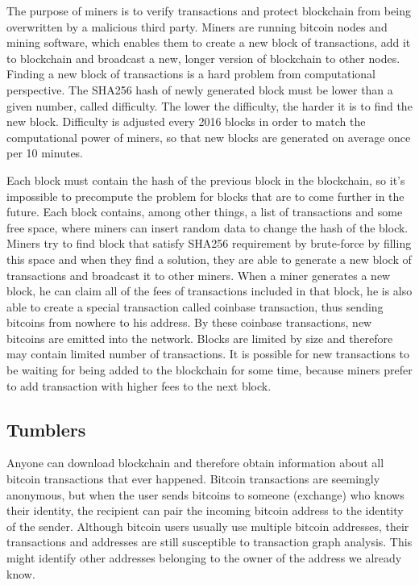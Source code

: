 \documentclass[
  digital, %
  table,   %
  lof,     %
  lot,     %
  oneside
]{fithesis3}
\begin{document}
The purpose of miners is to verify transactions and protect blockchain
from being overwritten by a malicious third party.
Miners are running bitcoin nodes and mining software,
which enables them to create a new block of transactions,
add it to blockchain and broadcast a new, longer version of blockchain to other nodes.
Finding a new block of transactions is a hard problem from computational perspective.
The SHA256 hash of newly generated block must be lower than a given number, called difficulty.
The lower the difficulty, the harder it is to find the new block.
Difficulty is adjusted every 2016 blocks in order to match the computational power of miners,
so that new blocks are generated on average once per 10 minutes.

Each block must contain the hash of the previous block in the blockchain, so it's impossible
to precompute the problem for blocks that are to come further in the future. 
Each block contains, among other things, a list of transactions and some free space,
where miners can insert random data to change the hash of the block.
Miners try to find block that satisfy SHA256 requirement
by brute-force by filling this space and when they find a solution,
they are able to generate a new block of transactions and broadcast it to other miners.
When a miner generates a new block, he can claim all of the fees of transactions included in that block,
he is also able to create a special transaction called coinbase transaction, thus sending bitcoins from
nowhere to his address. By these coinbase transactions, new bitcoins are emitted into the network.
Blocks are limited by size and therefore may contain limited number of transactions.
It is possible for new transactions to be waiting for being added to the blockchain for some time,
because miners prefer to add transaction with higher fees to the next block.

\subsection{Tumblers}
Anyone can download blockchain and therefore obtain information about all bitcoin transactions that ever happened.
Bitcoin transactions are seemingly anonymous, but when the user sends bitcoins to
someone (exchange) who knows their identity, the recipient can pair the incoming bitcoin address
to the identity of the sender.
Although bitcoin users usually use multiple bitcoin addresses,
their transactions and addresses are still 
susceptible to transaction graph analysis.
This might identify other addresses belonging to the owner of the address we already know.
\end{document}
